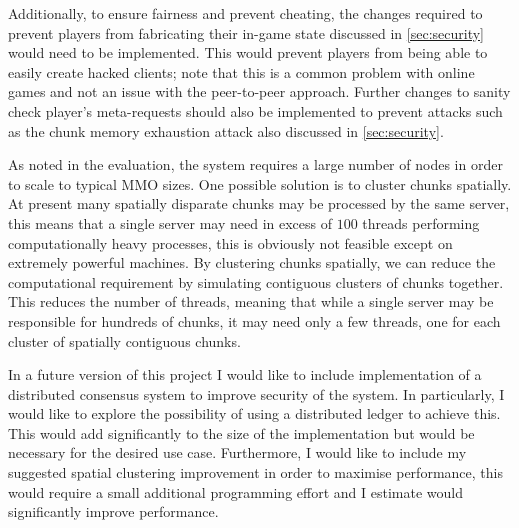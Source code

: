\documentclass[12pt,notitlepage,a4paper]{report}
\begin{document}
	Additionally, to ensure fairness and prevent cheating, the changes required to prevent players from fabricating their in-game state discussed in \cref{sec:security} would need to be implemented. This would prevent players from being able to easily create hacked clients; note that this is a common problem with online games and not an issue with the peer-to-peer approach. Further changes to sanity check player's meta-requests should also be implemented to prevent attacks such as the chunk memory exhaustion attack also discussed in \cref{sec:security}.
	
	As noted in the evaluation, the system requires a large number of nodes in order to scale to typical MMO sizes. One possible solution is to cluster chunks spatially. At present many spatially disparate chunks may be processed by the same server, this means that a single server may need in excess of $100$ threads performing computationally heavy processes, this is obviously not feasible except on extremely powerful machines. By clustering chunks spatially, we can reduce the computational requirement by simulating contiguous clusters of chunks together. This reduces the number of threads, meaning that while a single server may be responsible for hundreds of chunks, it may need only a few threads, one for each cluster of spatially contiguous chunks.
	
	In a future version of this project I would like to include implementation of a distributed consensus system to improve security of the system. In particularly, I would like to explore the possibility of using a distributed ledger to achieve this. This would add significantly to the size of the implementation but would be necessary for the desired use case. Furthermore, I would like to include my suggested spatial clustering improvement in order to maximise performance, this would require a small additional programming effort and I estimate would significantly improve performance.
	
	\clearpage
	
\end{document}
